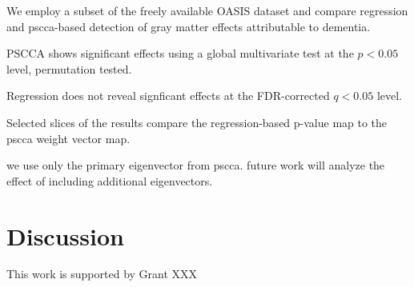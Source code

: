 \documentclass{llncs}
\begin{document}
We employ a subset of the freely available OASIS dataset and compare
regression and pscca-based detection of gray matter effects
attributable to dementia.

PSCCA shows significant effects using a global multivariate test at
the $p<0.05$ level, permutation tested.  

Regression does not reveal signficant effects at the FDR-corrected
$q<0.05$ level.  

Selected slices of the results compare the regression-based p-value
map to the pscca weight vector map.  

we use only the primary eigenvector from pscca.  future work will
analyze the effect of including additional eigenvectors. 

\section{Discussion}

 This work is supported by Grant XXX 


\end{document}
